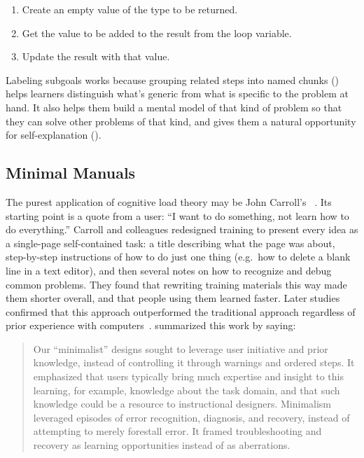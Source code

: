 \begin{enumerate}

\item
  Create an empty value of the type to be returned.

\item
  Get the value to be added to the result from the loop variable.

\item
  Update the result with that value.

\end{enumerate}

Labeling subgoals works because grouping related steps into named chunks ()
helps learners distinguish what's generic from what is specific to the problem at hand.
It also helps them build a mental model of that kind of problem
so that they can solve other problems of that kind,
and gives them a natural opportunity for self-explanation ().

\subsection*{Minimal Manuals}

The purest application of cognitive load theory may be John Carroll's
~\cite{Carr1987,Carr2014}.
Its starting point is a quote from a user:
``I want to do something, not learn how to do everything.''
Carroll and colleagues redesigned training to present every idea as a single-page self-contained task:
a title describing what the page was about,
step-by-step instructions of how to do just one thing
(e.g.\ how to delete a blank line in a text editor),
and then several notes on how to recognize and debug common problems.
They found that rewriting training materials this way made them shorter overall,
and that people using them learned faster.
Later studies confirmed that this approach outperformed the traditional approach
regardless of prior experience with computers~\cite{Lazo1993}.
\cite{Carr2014} summarized this work by saying:

\begin{quote}

  Our ``minimalist'' designs sought to leverage user initiative and prior knowledge,
  instead of controlling it through warnings and ordered steps.
  It emphasized that users typically bring much expertise and insight to this learning,
  for example,
  knowledge about the task domain,
  and that such knowledge could be a resource to instructional designers.
  Minimalism leveraged episodes of error recognition, diagnosis, and recovery,
  instead of attempting to merely forestall error.
  It framed troubleshooting and recovery as learning opportunities instead of as aberrations.

\end{quote}


